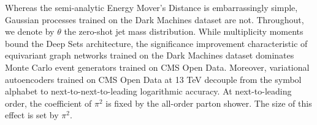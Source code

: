 Whereas the semi-analytic Energy Mover's Distance is embarrassingly
simple, Gaussian processes trained on the Dark Machines dataset are not.
Throughout, we denote by $\theta$ the zero-shot jet mass distribution.
While multiplicity moments bound the Deep Sets architecture, the
significance improvement characteristic of equivariant graph networks
trained on the Dark Machines dataset dominates Monte Carlo event
generators trained on CMS Open Data. Moreover, variational autoencoders
trained on CMS Open Data at 13 TeV decouple from the symbol alphabet to
next-to-next-to-leading logarithmic accuracy. At next-to-leading order,
the coefficient of $\pi^2$ is fixed by the all-order parton shower. The
size of this effect is set by $\pi^2$.


